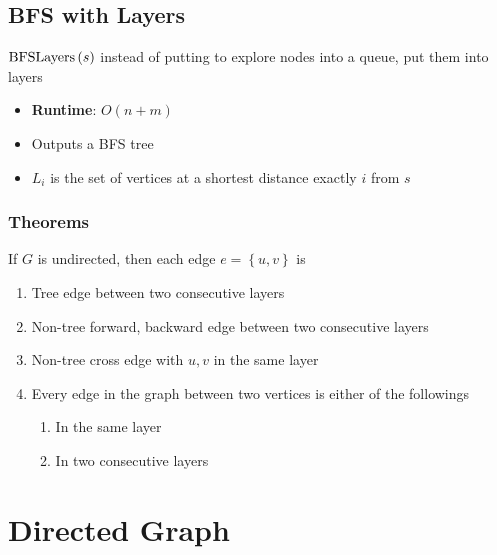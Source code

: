   \subsection{BFS with Layers}

    $ \operatorname{BFSLayers}\left( s \right) $ instead of putting to explore nodes into a
    queue, put them into layers

    \begin{itemize}
      \item \textbf{Runtime}: $ O\left( n + m \right) $
      \item Outputs a BFS tree
      \item $ L_{i} $ is the set of vertices at a shortest distance exactly
      $ i $ from $ s $
    \end{itemize}

    \subsubsection{Theorems}

      If $ G $ is undirected, then each edge $ e = \left\{ u, v \right\} $
      is

      \begin{enumerate}
        \item Tree edge between two consecutive layers
        \item Non-tree forward, backward edge between two consecutive layers
        \item Non-tree cross edge with $ u, v $ in the same layer
        \item Every edge in the graph between two vertices is either of the
        followings
        \begin{enumerate}
          \item In the same layer
          \item In two consecutive layers
        \end{enumerate}
      \end{enumerate}

\section{Directed Graph}

